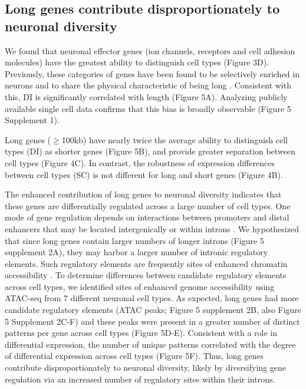 \subsection{Long genes contribute disproportionately to neuronal diversity}

We found that neuronal effector genes (ion channels, receptors and cell adhesion molecules) have the greatest ability to distinguish cell types (Figure 3D). Previously, these categories of genes have been found to be selectively enriched in neurons and to share the physical characteristic of being long \citep{Sugino_2014,Gabel_2015,Zylka_2015}. Consistent with this, DI is significantly correlated with length (Figure 5A). Analyzing publicly available single cell data confirms that this bias is broadly observable (Figure 5 Supplement 1). 

Long genes ($\geq$100kb) have nearly twice the average ability to distinguish cell types (DI) as shorter genes (Figure 5B), and provide greater separation between cell types (Figure 4C). In contrast, the robustness of expression differences between cell types (SC) is not different for long and short genes (Figure 4B). 

The enhanced contribution of long genes to neuronal diversity indicates that these genes are differentially regulated across a large number of cell types. One mode of gene regulation depends on interactions between promoters and distal enhancers that may be located intergenically or within introns \citep{Kim_2010,Gray_2017}. We hypothesized that since long genes contain larger numbers of longer introns (Figure 5 supplement 2A), they may harbor a larger number of intronic regulatory elements. Such regulatory elements are frequently sites of enhanced chromatin accessibility \citep{Harrow_2012}. 
To determine differences between candidate regulatory elements across cell types, we identified sites of enhanced genome accessibility using ATAC-seq \citep{Buenrostro_2013} from 7 different neuronal cell types. As expected, long genes had more candidate regulatory elements (ATAC peaks; Figure 5 supplement 2B, also Figure 5 Supplement 2C-F) and these peaks were present in a greater number of distinct patterns per gene across cell types (Figure 5D-E). Consistent with a role in differential expression, the number of unique patterns correlated with the degree of differential expression across cell types (Figure 5F). Thus, long genes contribute disproportionately to neuronal diversity, likely by diversifying  gene regulation via an increased number of regulatory sites within their introns. 


